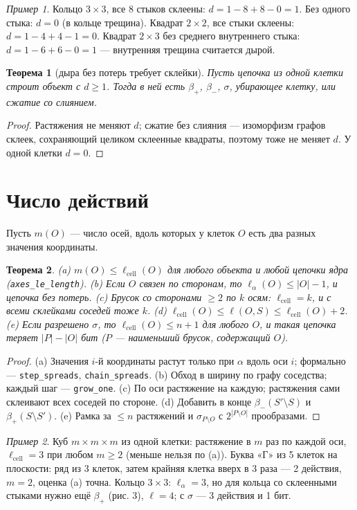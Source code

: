 \documentclass[11pt,a4paper]{article}
\theoremstyle{plain}
\newtheorem{theorem}{Теорема}[section]
\theoremstyle{definition}
\theoremstyle{remark}
\newtheorem*{example}{Пример}
\newcommand{\lc}{\ell_{\mathrm{cell}}}
\newcommand{\lean}[1]{\texttt{#1}}
\begin{document}
\begin{example}
Кольцо $3\times3$, все 8 стыков склеены: $d=1-8+8-0=1$. Без одного стыка: $d=0$ (в кольце трещина). Квадрат $2\times2$, все стыки склеены: $d=1-4+4-1=0$. Квадрат $2\times3$ без среднего внутреннего стыка: $d=1-6+6-0=1$ — внутренняя трещина считается дырой.
\end{example}

\begin{theorem}[дыра без потерь требует склейки]
Пусть цепочка из одной клетки строит объект с $d\ge1$. Тогда в ней есть $\beta_+$, $\beta_-$, $\sigma$, убирающее клетку, или сжатие со слиянием.
\end{theorem}
\begin{proof}
Растяжения не меняют $d$; сжатие без слияния — изоморфизм графов склеек, сохраняющий целиком склеенные квадраты, поэтому тоже не меняет $d$. У одной клетки $d=0$.
\end{proof}

\section{Число действий}\label{sec:count}

Пусть $m(O)$ — число осей, вдоль которых у клеток $O$ есть два разных значения координаты.

\begin{theorem}\label{thm:bounds}
(a) $m(O)\le\lc(O)$ для любого объекта и любой цепочки ядра (\lean{axes\_le\_length}). (b) Если $O$ связен по сторонам, то $\ell_\alpha(O)\le|O|-1$, и цепочка без потерь. (c) Брусок со сторонами $\ge2$ по $k$ осям: $\lc=k$, и с всеми склейками соседей тоже $k$. (d) $\lc(O)\le\ell(O,S)\le\lc(O)+2$. (e) Если разрешено $\sigma$, то $\lc(O)\le n+1$ для любого $O$, и такая цепочка теряет $|P|-|O|$ бит ($P$ — наименьший брусок, содержащий $O$).
\end{theorem}
\begin{proof}
(a) Значения $i$-й координаты растут только при $\alpha$ вдоль оси $i$; формально — \lean{step\_spreads}, \lean{chain\_spreads}. (b) Обход в ширину по графу соседства; каждый шаг — \lean{grow\_one}. (c) По оси растяжение на каждую; растяжения сами склеивают всех соседей по стороне. (d) Добавить в конце $\beta_-(S'\setminus S)$ и $\beta_+(S\setminus S')$. (e) Рамка за $\le n$ растяжений и $\sigma_{P\setminus O}$ с $2^{|P\setminus O|}$ прообразами.
\end{proof}

\begin{example}
Куб $m\times m\times m$ из одной клетки: растяжение в $m$ раз по каждой оси, $\lc=3$ при любом $m\ge2$ (меньше нельзя по (a)). Буква «Г» из 5 клеток на плоскости: ряд из 3 клеток, затем крайняя клетка вверх в 3 раза — 2 действия, $m=2$, оценка (a) точна. Кольцо $3\times3$: $\ell_\alpha=3$, но для кольца со склеенными стыками нужно ещё $\beta_+$ (рис. 3), $\ell=4$; с $\sigma$ — 3 действия и 1 бит.
\end{example}
\end{document}
